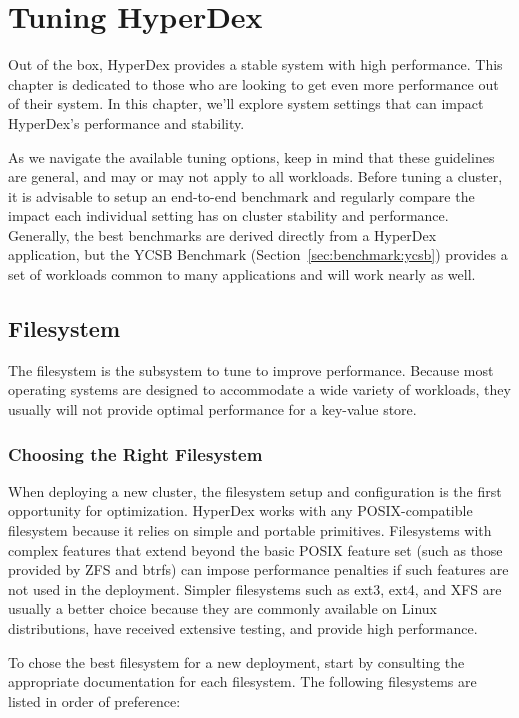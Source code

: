 \chapter{Tuning HyperDex}
\label{chap:tuning}

Out of the box, HyperDex provides a stable system with high performance.  This
chapter is dedicated to those who are looking to get even more performance out
of their system.  In this chapter, we'll explore system settings that can impact
HyperDex's performance and stability.

As we navigate the available tuning options, keep in mind that these guidelines
are general, and may or may not apply to all workloads.  Before tuning a
cluster, it is advisable to setup an end-to-end benchmark and regularly compare
the impact each individual setting has on cluster stability and performance.
Generally, the best benchmarks are derived directly from a HyperDex application,
but the YCSB Benchmark (Section~\ref{sec:benchmark:ycsb}) provides a set of
workloads common to many applications and will work nearly as well.

\section{Filesystem}
\label{sec:tuning:filesystem}

The filesystem is the subsystem to tune to improve performance.  Because most
operating systems are designed to accommodate a wide variety of workloads, they
usually will not provide optimal performance for a key-value store.

\subsection{Choosing the Right Filesystem}

When deploying a new cluster, the filesystem setup and configuration is the
first opportunity for optimization.  HyperDex works with any POSIX-compatible
filesystem because it relies on simple and portable primitives.  Filesystems
with complex features that extend beyond the basic POSIX feature set (such as
those provided by ZFS and btrfs) can impose performance penalties if such
features are not used in the deployment.  Simpler filesystems such as ext3,
ext4, and XFS are usually a better choice because they are commonly available on
Linux distributions, have received extensive testing, and provide high
performance.

To chose the best filesystem for a new deployment, start by consulting the
appropriate documentation for each filesystem.  The following filesystems
are listed in order of preference:

